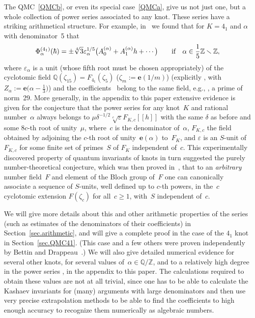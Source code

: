 \documentclass[pdftex]{sigma}
\numberwithin{equation}{section}
\def\BZ{\mathbb Z}
\def\BQ{\mathbb Q}
\def\z{\zeta}
\def\e{\mathbf{e}}
\def\a{\alpha}
\def\Z{\mathbb Z}
\def\Q{\mathbb Q}
\def\e{\mathbf{e}}
\def\a{\alpha}
\def\z{\zeta}
\def\be{\begin{equation}}
\def\ee{\end{equation}}
\def\ve{\varepsilon}
\def\ssm{\smallsetminus}
\begin{document}
The QMC~\eqref{QMCb}, or even its special case~\eqref{QMCa}, give us not just
one, but a whole collection of power series \smash{$\Phi_\a^{(K)}(\hbar)$} associated to
any knot. These series \smash{$\Phi^{(K)}_\a(\hbar)$} have a striking arithmetical structure.
For example, in~\cite{Za:QMF} we found that for $K=4_1$ and $\a$ with
denominator~5 that
\be
\label{as41at5}
%
\Phi^{(4_1)}_{\a}(\hbar)= \pm  \sqrt[4]{3} \ve_\a^{1/5}
\bigl(A^{(\a)}_0 + A^{(\a)}_1 h +\cdots\bigr)
\qquad\text{if\quad$\a \in \frac15 \Z\ssm\Z,$}
\ee
where $\ve_\a$ is a unit (whose fifth root must be chosen appropriately) of the
cyclotomic field $\Q(\z_{15})=F_{4_1}(\z_5)$ ($\z_m:=\e(1/m)$) \big(explicitly
\smash{$\ve_\a= \frac{Z_\a^4-1}{Z_\a(Z_\a+1)^2}$}, with $Z_\a:=\e\big(\a-\frac13\big)$\big)
and the coefficients~\smash{$A_n^{(\a)}$} belong to the same field,
e.g., \smash{$A^{(a)}_0= 1+Z_\a^2+Z_\a^{-2}-Z_\a^4-Z_\a^{-4}$}, a prime of norm~29.
More generally, in the appendix to this paper extensive evidence is given for
the conjecture that the power series \smash{$\Phi^{(K)}_\a(\hbar)$} for any knot~$K$ and
rational number~$\a$ always belongs to
$\mu \delta^{-1/2}\sqrt[c]{\ve}F_{K,c}[[h]]$ with the same $\delta$ as before
and some $8c$-th root of unity~$\mu$, where~$c$ is the denominator of~$\a$, $F_{K,c}$
the field obtained by adjoining the $c$-th root of unity~$\e(\a)$ to~$F_K$, and
$\ve$ is an $S$-unit of $F_{K,c}$ for some finite set of primes~$S$ of $F_K$
independent of~$c$. This experimentally discovered property of quantum
invariants of knots in turn suggested the purely number-theoretical conjecture,
which was then proved in~\cite{CGZ}, that to an \emph{arbitrary} number
field~$F$ and element of the Bloch group of~$F$ one can canonically associate
a sequence of $S$-units, well defined up to $c$-th powers, in the~$c$ cyclotomic
extension $F(\z_c)$ for all~$c\ge1$, with~$S$ independent of~$c$.

We will give more details about this and other arithmetic properties of the
series \smash{$\Phi^{(K)}_\a$} (such as estimates of the denominators of their
coefficients) in Section~\ref{sec.arithmetic}, and will give a complete proof
in the case of the $4_1$ knot in Section~\ref{sec.QMC41}.
(This case and a few others were proven independently by Bettin and
Drappeau~\cite{BD}.) We will also give detailed numerical evidence for
several other knots, for several values of~$\a\in\BQ/\BZ$, and to a relatively
high degree in the power series \smash{$\Phi^{(K)}_\a(\hbar)$}, in the appendix to this
paper. The calculations required to obtain these values are not at all trivial,
since one has to be able to calculate the Kashaev invariants for (many)
arguments with large denominators and then use very precise extrapolation
methods to be able to find the coefficients to high enough accuracy to
recognize them numerically as algebraic numbers.
\end{document}
